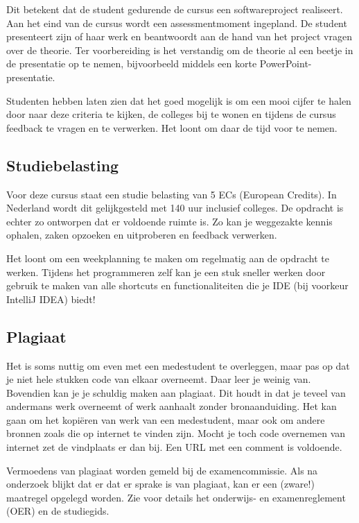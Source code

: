 \documentclass[dutch,a4paper,12pt,doubleside]{book}
\begin{document}
Dit betekent dat de student gedurende de cursus een softwareproject realiseert.
Aan het eind van de cursus wordt een assessmentmoment ingepland. De student
presenteert zijn of haar werk en beantwoordt aan de hand van het project
vragen over de theorie. Ter voorbereiding is het verstandig om de theorie al 
een beetje in de presentatie op te nemen, 
bijvoorbeeld middels een korte PowerPoint-presentatie.

Studenten hebben laten zien dat het goed mogelijk is om een mooi cijfer te halen 
door naar deze criteria te kijken, de colleges bij te wonen en tijdens de cursus 
feedback te vragen en te verwerken. Het loont om daar de tijd voor te nemen.

\subsection*{Studiebelasting}
Voor deze cursus staat een studie belasting van 5 ECs (European Credits). 
In Nederland wordt dit gelijkgesteld met 140 uur inclusief colleges.
De opdracht is echter zo ontworpen dat er voldoende ruimte is.
Zo kan je weggezakte kennis ophalen, zaken opzoeken en uitproberen
en feedback verwerken.

Het loont om een weekplanning te maken om regelmatig aan de opdracht 
te werken. Tijdens het programmeren zelf kan je een stuk sneller werken door 
gebruik te maken van alle shortcuts en functionaliteiten die je 
IDE (bij voorkeur IntelliJ IDEA) biedt!

\subsection*{Plagiaat}
Het is soms nuttig om even met een medestudent te overleggen,
maar pas op dat je niet hele stukken code van elkaar overneemt.
Daar leer je weinig van. Bovendien kan je je schuldig maken aan 
plagiaat. Dit houdt in dat je teveel van andermans werk overneemt 
of werk aanhaalt zonder bronaanduiding. Het kan gaan om het kopiëren 
van werk van een medestudent, maar ook om andere bronnen zoals die op 
internet te vinden zijn. Mocht je toch code overnemen van internet 
zet de vindplaats er dan bij. Een URL met een comment is voldoende.

Vermoedens van plagiaat worden gemeld bij de examencommissie. 
Als na onderzoek blijkt dat er dat er sprake is
van plagiaat, kan er een (zware!) maatregel opgelegd worden.
Zie voor details het onderwijs- en examenreglement (OER) en de studiegids.

\newpage
\end{document}
